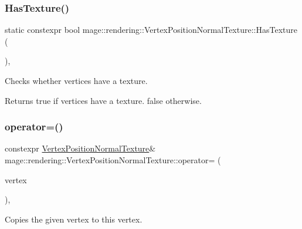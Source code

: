 \subsubsection{\texorpdfstring{Has\+Texture()}{HasTexture()}}
{\footnotesize\ttfamily static constexpr bool mage\+::rendering\+::\+Vertex\+Position\+Normal\+Texture\+::\+Has\+Texture (\begin{DoxyParamCaption}{ }\end{DoxyParamCaption})\hspace{0.3cm}{\ttfamily [static]}, {\ttfamily [noexcept]}}

Checks whether vertices have a texture.

\begin{DoxyReturn}{Returns}
{\ttfamily true} if vertices have a texture. {\ttfamily false} otherwise. 
\end{DoxyReturn}
\mbox{\label{structmage_1_1rendering_1_1_vertex_position_normal_texture_ab41cec4ed6c1a38cd4bc5c73e78ec747}} 
\subsubsection{\texorpdfstring{operator=()}{operator=()}\hspace{0.1cm}{\footnotesize\ttfamily [1/2]}}
{\footnotesize\ttfamily constexpr \mbox{\hyperlink{structmage_1_1rendering_1_1_vertex_position_normal_texture}{Vertex\+Position\+Normal\+Texture}}\& mage\+::rendering\+::\+Vertex\+Position\+Normal\+Texture\+::operator= (\begin{DoxyParamCaption}\item[{const \mbox{\hyperlink{structmage_1_1rendering_1_1_vertex_position_normal_texture}{Vertex\+Position\+Normal\+Texture}} \&}]{vertex }\end{DoxyParamCaption})\hspace{0.3cm}{\ttfamily [default]}, {\ttfamily [noexcept]}}

Copies the given vertex to this vertex.


